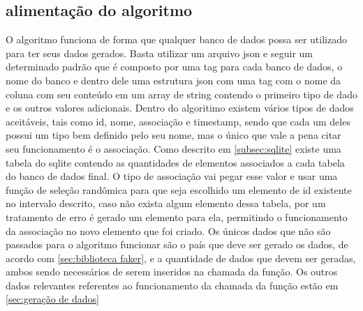 \documentclass[
	12pt,				%
	openright,			%
	oneside,			%
	a4paper,			%
	english,			%
	french,				%
	spanish,			%
	brazil,				%
	]{abntex2}
\begin{document}
\subsection{alimentação do algoritmo}
\label{subsec:alimentação do algoritmo}
O algoritmo funciona de forma que qualquer banco de dados possa ser utilizado para ter seus dados gerados. Basta utilizar um arquivo json e seguir um determinado padrão que é composto por uma tag para cada banco de dados, o nome do banco e dentro dele uma estrutura json com uma tag com o nome da coluna com seu conteúdo em um array de string contendo o primeiro tipo de dado e os outros valores adicionais.\newline
Dentro do algoritimo existem vários tipos de dados aceitáveis, tais como id, nome, associação e timestamp, sendo que cada um deles possui um tipo bem definido pelo seu nome, mas o único que vale a pena citar seu funcionamento é o associação. Como descrito em \autoref{subsec:sqlite} existe uma tabela do sqlite contendo as quantidades de elementos associados a cada tabela do banco de dados final. O tipo de associação vai pegar esse valor e usar uma função de seleção randômica para que seja escolhido um elemento de id existente no intervalo descrito, caso não exista algum elemento dessa tabela, por um tratamento de erro é gerado um elemento para ela, permitindo o funcionamento da associação no novo elemento que foi criado.\newline
Os únicos dados que não são passados para o algoritmo funcionar são o país que deve ser gerado os dados, de acordo com \autoref{sec:biblioteca faker}, e a quantidade de dados que devem ser geradas, ambos sendo necessários de serem inseridos na chamada da função.
Os outros dados relevantes referentes ao funcionamento da chamada da função estão em \autoref{sec:geração de dados}
\end{document}
